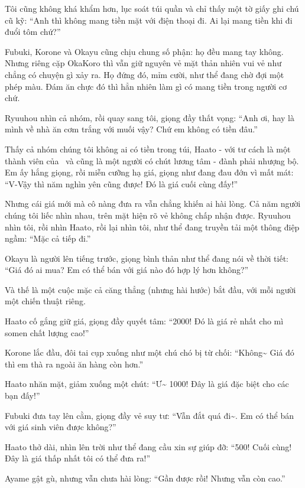 \documentclass[../main.tex]{subfiles}
\begin{document}
Tôi cũng không khá khẩm hơn, lục soát túi quần và chỉ thấy một tờ giấy ghi chú cũ kỹ: ``Anh thì không mang tiền mặt với điện thoại đi. Ai lại mang tiền khi đi đuổi tôm chứ?''

Fubuki, Korone và Okayu cũng chịu chung số phận: họ đều mang tay không. Nhưng riêng cặp OkaKoro thì vẫn giữ nguyên vẻ mặt thản nhiên vui vẻ như chẳng có chuyện gì xảy ra. Họ đứng đó, mỉm cười, như thể đang chờ đợi một phép màu. Đám ăn chực đó thì hẳn nhiên làm gì có mang tiền trong người cơ chứ.

Ryuuhou nhìn cả nhóm, rồi quay sang tôi, giọng đầy thất vọng: ``Anh ơi, hay là mình về nhà ăn cơm trắng với muối vậy? Chứ em không có tiền đâu.''

Thấy cả nhóm chúng tôi không ai có tiền trong túi, Haato - với tư cách là một thành viên của \hll\ và cũng là một người có chút lương tâm - đành phải nhượng bộ. Em ấy hắng giọng, rồi miễn cưỡng hạ giá, giọng như đang đau đớn vì mất mát: ``V-Vậy thì năm nghìn yên cũng được! Đó là giá cuối cùng đấy!''

Nhưng cái giá mới mà cô nàng đưa ra vẫn chẳng khiến ai hài lòng. Cả năm người chúng tôi liếc nhìn nhau, trên mặt hiện rõ vẻ không chấp nhận được. Ryuuhou nhìn tôi, rồi nhìn Haato, rồi lại nhìn tôi, như thể đang truyền tải một thông điệp ngầm: ``Mặc cả tiếp đi.''


Okayu là người lên tiếng trước, giọng bình thản như thể đang nói về thời tiết: ``Giá đó ai mua? Em có thể bán với giá nào đó hợp lý hơn không?''

Và thế là một cuộc mặc cả căng thẳng (nhưng hài hước) bắt đầu, với mỗi người một chiến thuật riêng.

Haato cố gắng giữ giá, giọng đầy quyết tâm: ``2000! Đó là giá rẻ nhất cho mì somen chất lượng cao!''

Korone lắc đầu, đôi tai cụp xuống như một chú chó bị từ chối: ``Không\~{} Giá đó thì em thà ra ngoài ăn hàng còn hơn.''

Haato nhăn mặt, giảm xuống một chút: ``Ư\~{} 1000! Đây là giá đặc biệt cho các bạn đấy!''

Fubuki đưa tay lên cằm, giọng đầy vẻ suy tư: ``Vẫn đắt quá đi\~{}. Em có thể bán với giá sinh viên được không?''

Haato thở dài, nhìn lên trời như thể đang cầu xin sự giúp đỡ: ``500! Cuối cùng! Đây là giá thấp nhất tôi có thể đưa ra!''

Ayame gật gù, nhưng vẫn chưa hài lòng: ``Gần được rồi! Nhưng vẫn còn cao.''
\end{document}
